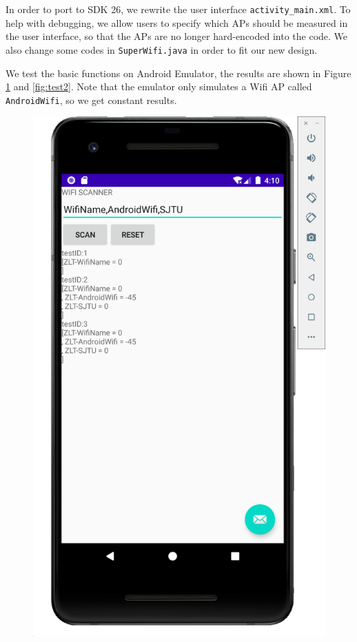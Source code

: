 In order to port to SDK 26, we rewrite the user interface \texttt{activity\_main.xml}. To help with debugging, we allow users to specify which APs should be measured in the user interface, so that the APs are no longer hard-encoded into the code. We also change some codes in \texttt{SuperWifi.java} in order to fit our new design.

We test the basic functions on Android Emulator, the results are shown in Figure \ref{fig:test1} and \ref{fig:test2}. Note that the emulator only simulates a Wifi AP called \texttt{AndroidWifi}, so we get constant results.



\begin{figure}[t]
  \centering
  \begin{minipage}[t]{0.48\linewidth}
  \centering
  \label{fig:test1}
  \includegraphics[width=0.8\columnwidth]{img/test1.png} 

\end{minipage}
\end{figure}
